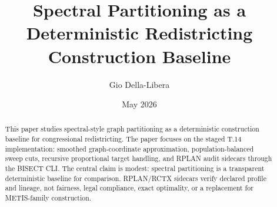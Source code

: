 \documentclass[12pt]{article}
\title{Spectral Partitioning as a Deterministic Redistricting Construction Baseline}
\author{Gio Della-Libera}
\date{May 2026}
\begin{document}
\maketitle

\begin{abstract}
This paper studies spectral-style graph partitioning as a deterministic construction
baseline for congressional redistricting. The paper focuses on the staged T.14
implementation: smoothed graph-coordinate approximation, population-balanced sweep cuts,
recursive proportional target handling, and RPLAN audit sidecars through the
BISECT CLI. The central claim is modest: spectral partitioning is a transparent
deterministic baseline for comparison. RPLAN/RCTX sidecars verify declared
profile and lineage, not fairness, legal compliance, exact optimality, or a
replacement for METIS-family construction.
\end{abstract}









\nocite{bisect-t14-spec}


\end{document}
